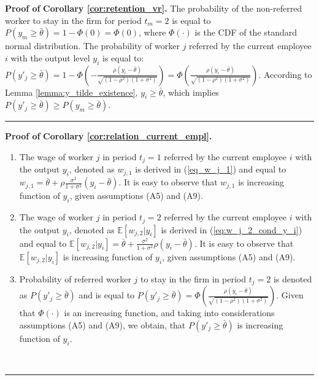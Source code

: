 \documentclass[12pt]{article}
\newenvironment{proof}[1][Proof of]{\noindent\textbf{#1} }{\ \rule{0.5em}{0.5em}}
\begin{document}
\begin{proof}
    \textbf{Corollary \ref{cor:retention_vr}.}
    The probability of the non-referred worker to stay in the firm for period $t_m = 2$ is equal to $P\left(y_m \geq \bar{\theta}\right) = 1-\Phi(0) = \Phi(0)$, where $\Phi(\cdot)$ is the CDF of the standard normal distribution. The probability of worker $j$ referred by the current employee $i$ with the output level $y_i$ is equal to: $P\left( y'_j \geq \bar{\theta} \right) = 1-\Phi\left( -\frac{\rho(y_i - \bar{\theta})}{\sqrt{(1-\rho^2)(1+\sigma^2)}} \right) = \Phi\left(\frac{\rho(y_i - \bar{\theta})}{\sqrt{(1-\rho^2)(1+\sigma^2)}} \right)$. According to Lemma \ref{lemma:y_tilde_existence}, $y_i \geq \bar{\theta}$, which implies $P\left( y'_j \geq \bar{\theta} \right) \geq P\left(y_m \geq \bar{\theta}\right)$.
\end{proof}

\begin{proof}
    \textbf{Corollary \ref{cor:relation_current_empl}.}
    \begin{enumerate}[label={\roman*})]
        \item The wage of worker $j$ in period $t_j = 1$ referred by the current employee $i$ with the output $y_i$, denoted as $w_{j,1}$ is derived in (\ref{eq_w_j_1}) and equal to $w_{j,1} = \bar{\theta}+\rho\frac{\sigma^2}{1+\sigma^2}(y_i-\bar{\theta})$. It is easy to observe that $w_{j,1}$ is increasing function of $y_i$, given assumptions (A5) and (A9).
        \item The wage of worker $j$ in period $t_j = 2$ referred by the current employee $i$ with the output $y_i$, denoted as $\mathbb{E}[w_{j,2}|y_i]$ is derived in (\ref{eq:w_j_2_cond_y_i}) and equal to $\mathbb{E}[w_{j,2}|y_i] = \bar{\theta}+\frac{\sigma^2}{1+\sigma^2}\rho(y_i-\bar{\theta})$. It is easy to observe that $\mathbb{E}[w_{j,2}|y_i]$ is increasing function of $y_i$, given assumptions (A5) and (A9).
        \item Probability of referred worker $j$ to stay in the firm in period $t_j = 2$ is denoted as $P\left( y'_j \geq \bar{\theta} \right)$ and is equal to $P\left( y'_j \geq \bar{\theta} \right) = \Phi\left(\frac{\rho(y_i - \bar{\theta})}{\sqrt{(1-\rho^2)(1+\sigma^2)}} \right)$. Given that $\Phi(\cdot)$ is an increasing function, and taking into considerations assumptions (A5) and (A9), we obtain, that $P\left( y'_j \geq \bar{\theta} \right)$ is increasing function of $y_i$.
    \end{enumerate}
\end{proof}
\end{document}

